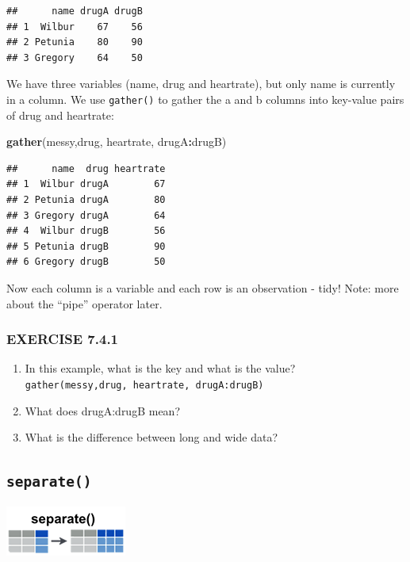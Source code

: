 \documentclass[
]{book}
\newenvironment{Shaded}{\begin{snugshade}}{\end{snugshade}}
\newcommand{\FunctionTok}[1]{\textcolor[rgb]{0.13,0.29,0.53}{\textbf{#1}}}
\newcommand{\NormalTok}[1]{#1}
\newcommand{\SpecialCharTok}[1]{\textcolor[rgb]{0.81,0.36,0.00}{\textbf{#1}}}
\begin{document}
\begin{verbatim}
##      name drugA drugB
## 1  Wilbur    67    56
## 2 Petunia    80    90
## 3 Gregory    64    50
\end{verbatim}

We have three variables (name, drug and heartrate), but only name is currently in a column. We use \texttt{gather()} to gather the a and b columns into key-value pairs of drug and heartrate:

\begin{Shaded}
\begin{Highlighting}[]
  \FunctionTok{gather}\NormalTok{(messy,drug, heartrate, drugA}\SpecialCharTok{:}\NormalTok{drugB)}
\end{Highlighting}
\end{Shaded}

\begin{verbatim}
##      name  drug heartrate
## 1  Wilbur drugA        67
## 2 Petunia drugA        80
## 3 Gregory drugA        64
## 4  Wilbur drugB        56
## 5 Petunia drugB        90
## 6 Gregory drugB        50
\end{verbatim}

Now each column is a variable and each row is an observation - tidy! Note: more about the ``pipe'' operator later.

\subsubsection*{EXERCISE 7.4.1}\label{exercise-7.4.1}

\begin{enumerate}
\def\labelenumi{\arabic{enumi}.}
\item
  In this example, what is the key and what is the value?
  \texttt{gather(messy,drug,\ heartrate,\ drugA:drugB)}
\item
  What does drugA:drugB mean?
\item
  What is the difference between long and wide data?
\end{enumerate}

\subsection*{\texorpdfstring{\texttt{separate()}}{separate()}}\label{separate}

\includegraphics{./figures/tidyr-separate.png}
\end{document}
